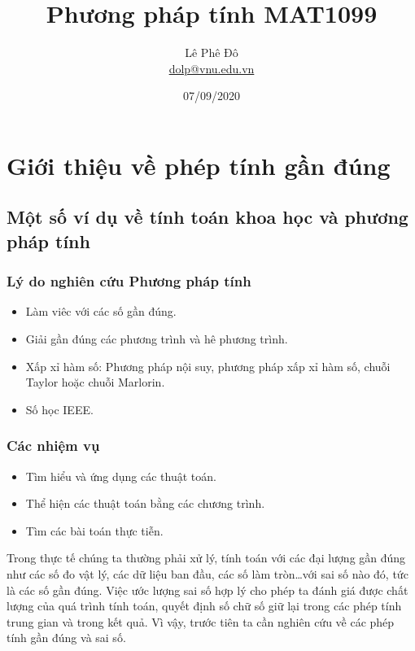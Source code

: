 \documentclass{article}    %
\author{Lê Phê Đô \\ \href{mailto:dolp@vnu.edu.vn}{dolp@vnu.edu.vn}}
\date{07/09/2020}
\title{Phương pháp tính MAT1099}
\def\blankpage{%
      \clearpage%
      \thispagestyle{empty}%
      \addtocounter{page}{-1}%
      \null%
      \clearpage}
\begin{document}
\maketitle

\blankpage

\section{Giới thiệu về phép tính gần đúng}

\subsection{Một số ví dụ về tính toán khoa học và phương pháp tính}

\subsubsection{Lý do nghiên cứu Phương pháp tính}

\begin{itemize}
    \item Làm viêc với các số gần đúng.
    \item Giải gần đúng các phương trình và hê phương trình.
    \item Xấp xỉ hàm số: Phương pháp nội suy, phương pháp xấp xỉ hàm số, chuỗi
    Taylor hoặc chuỗi Marlorin.
    \item Số học IEEE.
\end{itemize}

\subsubsection{Các nhiệm vụ}

\begin{itemize}
    \item Tìm hiểu và ứng dụng các thuật toán.
    \item Thể hiện các thuật toán bằng các chương trình.
    \item Tìm các bài toán thực tiễn.
\end{itemize}

Trong thực tế chúng ta thường phải xử lý, tính toán với các đại lượng gần đúng
như các số đo vật lý, các dữ liệu ban đầu, các số làm tròn…với sai số nào đó,
tức là các số gần đúng. Việc ước lượng sai số hợp lý cho phép ta đánh giá được
chất lượng của quá trình tính toán, quyết định số chữ số giữ lại trong các phép
tính trung gian và trong kết quả. Vì vậy, trước tiên ta cần nghiên cứu về các
phép tính gần đúng và sai số.
\end{document}
